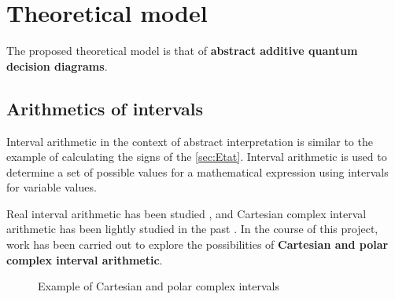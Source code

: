 \newpage

\chapter{Theoretical model}
\label{ch:Modele}

The proposed theoretical model is that of \textbf{abstract additive quantum decision diagrams}.

\section{Arithmetics of intervals}
\label{sec:ArithmetiqueIntervalles}

Interval arithmetic in the context of abstract interpretation is similar to the example of calculating the signs of the \autoref{sec:Etat}. Interval arithmetic is used to determine a set of possible values for a mathematical expression using intervals for variable values.

Real interval arithmetic has been studied \cite{Sunaga_2009}, and Cartesian complex interval arithmetic has been lightly studied in the past \cite{Rokne_1971}. In the course of this project, work has been carried out to explore the possibilities of \textbf{Cartesian and polar complex interval arithmetic}.

\begin{figure}
  \centering
  \caption{Example of Cartesian and polar complex intervals}
  \label{fig:intervalles}
\end{figure}

